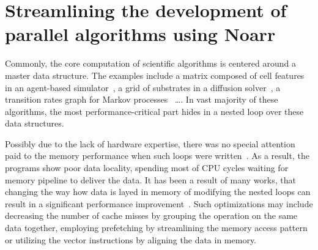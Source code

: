 \chapter{Streamlining the development of parallel algorithms using Noarr}





Commonly, the core computation of scientific algorithms is centered around a master data structure. The examples include a matrix composed of cell features in an agent-based simulator~\cite{ghaffarizadeh2018physicell}, a grid of substrates in a diffusion solver~\cite{ghaffarizadeh2016biofvm}, a transition rates graph for Markov processes~\cite{koltai2020exact} \dots. In vast majority of these algorithms, the most performance-critical part hides in a nested loop over these data structures.

Possibly due to the lack of hardware expertise, there was no special attention paid to the memory performance when such loops were written~\cite{clauss2000automatic}. As a result, the programs show poor data locality, spending most of CPU cycles waiting for memory pipeline to deliver the data. It has been a result of many works, that changing the way how data is layed in memory of modifying the nested loops can result in a significant performance improvement~\cite{gong2018empirical,stengel2015quantifying,serpa2019memory}. Such optimizations may include decreasing the number of cache misses by grouping the operation on the same data together, employing prefetching by streamlining the memory access pattern or utilizing the vector instructions by aligning the data in memory.

